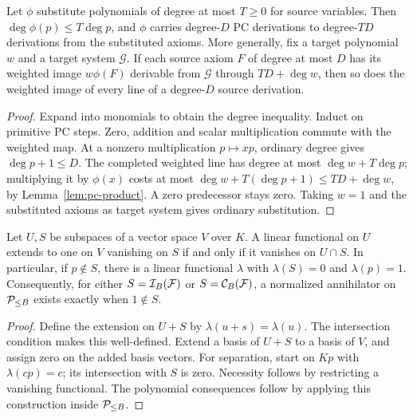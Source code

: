 \begin{lemma}\label{lem:substitution}
Let \(\phi\) substitute polynomials of degree at most
\(T\ge0\) for source variables. Then \(\deg\phi(p)\le T\deg p\), and
\(\phi\) carries degree-\(D\) PC derivations to degree-\(TD\) derivations
from the substituted axioms. More generally, fix a target polynomial \(w\)
and a target system \(\mathcal G\). If each source axiom \(F\) of degree
at most \(D\) has its weighted image \(w\phi(F)\) derivable from
\(\mathcal G\) through \(TD+\deg w\), then so does the weighted image
of every line of a degree-\(D\) source derivation.
\end{lemma}
\begin{proof}
Expand into monomials to obtain the degree inequality. Induct on primitive
PC steps. Zero, addition and scalar multiplication commute with the weighted
map. At a nonzero multiplication \(p\mapsto xp\), ordinary degree gives
\(\deg p+1\le D\). The completed weighted line has degree at most
\(\deg w+T\deg p\); multiplying it by \(\phi(x)\) costs at most
\(\deg w+T(\deg p+1)\le TD+\deg w\), by
Lemma~\ref{lem:pc-product}. A zero predecessor stays zero. Taking \(w=1\)
and the substituted axioms as target system gives ordinary substitution.
\end{proof}

\begin{lemma}\label{lem:duality}
Let \(U,S\) be subspaces of a vector space \(V\) over \(K\).
A linear functional on \(U\) extends to one on \(V\) vanishing on \(S\)
if and only if it vanishes on \(U\cap S\).
In particular, if \(p\notin S\), there is a linear functional
\(\lambda\) with \(\lambda(S)=0\) and \(\lambda(p)=1\).
Consequently, for either \(S=\mathcal I_B(\mathcal F)\) or
\(S=\mathcal C_B(\mathcal F)\), a normalized annihilator on
\(\mathcal P_{\le B}\) exists exactly when \(1\notin S\).
\end{lemma}
\begin{proof}
Define the extension on \(U+S\) by \(\lambda(u+s)=\lambda(u)\).
The intersection condition makes this well-defined. Extend a basis of
\(U+S\) to a basis of \(V\), and assign zero on the added basis vectors.
For separation, start on \(Kp\) with \(\lambda(cp)=c\); its intersection
with \(S\) is zero. Necessity follows by restricting a vanishing functional.
The polynomial consequences follow by applying this construction inside
\(\mathcal P_{\le B}\).
\end{proof}
